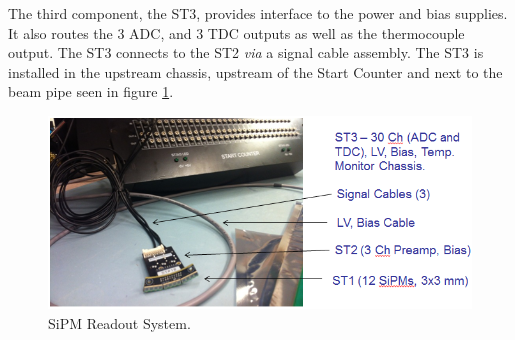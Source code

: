 The third component, the ST3, provides interface to the power and bias supplies.  It also routes the 3 ADC, and 3 TDC outputs as well as the thermocouple output.  The ST3 connects to the ST2 \emph{via} a signal cable assembly.  The ST3 is installed in the upstream chassis, upstream of the Start Counter and next to the beam pipe seen in figure \ref{fig:SiPM Readout System}.
\begin{figure}[!htb]
	\centering
	\includegraphics[width=1.0\columnwidth]{design/figs/SiPM_Readout_System}
	\caption[SiPM Readout System]{SiPM Readout System.}
	\label{fig:SiPM Readout System}
\end{figure}